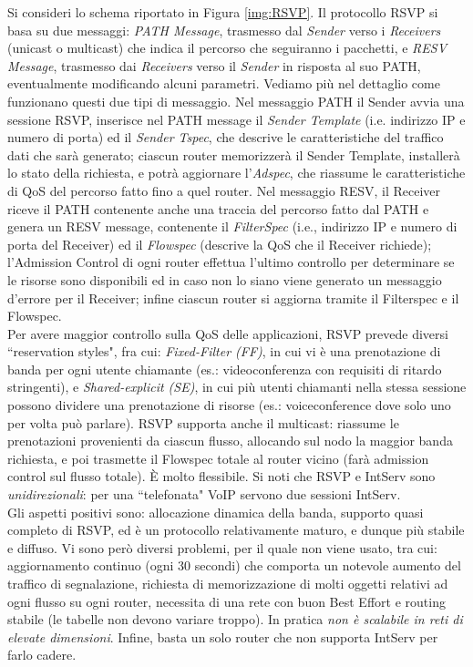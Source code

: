 Si consideri lo schema riportato in Figura \ref{img:RSVP}. Il protocollo RSVP si basa su due messaggi: \textit{PATH Message}, trasmesso dal \textit{Sender} verso i \textit{Receivers} (unicast o multicast) che indica il percorso che seguiranno i pacchetti, e \textit{RESV Message}, trasmesso dai \textit{Receivers} verso il \textit{Sender} in risposta al suo PATH, eventualmente modificando alcuni parametri. Vediamo più nel dettaglio come funzionano questi due tipi di messaggio. Nel messaggio PATH il Sender avvia una sessione RSVP, inserisce nel PATH message il \textit{Sender Template} (i.e. indirizzo IP e numero di porta) ed il \textit{Sender Tspec}, che descrive le caratteristiche del traffico dati che sarà generato; ciascun router memorizzerà il Sender Template, installerà lo stato della richiesta, e potrà aggiornare l'\textit{Adspec}, che riassume le caratteristiche di QoS del percorso fatto fino a quel router. Nel messaggio RESV, il Receiver riceve il PATH contenente anche una traccia del percorso fatto dal PATH e genera un RESV message, contenente il \textit{FilterSpec} (i.e., indirizzo IP e numero di porta del Receiver) ed il \textit{Flowspec} (descrive la QoS che il Receiver richiede); l'Admission Control di ogni router effettua l'ultimo controllo per determinare se le risorse sono disponibili ed in caso non lo siano viene generato un messaggio d'errore per il Receiver; infine ciascun router si aggiorna tramite il Filterspec e il Flowspec.\\
Per avere maggior controllo sulla QoS delle applicazioni, RSVP prevede diversi \textquotedblleft reservation styles", fra cui: \textit{Fixed-Filter (FF)}, in cui vi è una prenotazione di banda per ogni utente chiamante (es.: videoconferenza con requisiti di ritardo stringenti), e \textit{Shared-explicit (SE)}, in cui più utenti chiamanti nella stessa sessione possono dividere una prenotazione di risorse (es.: voiceconference dove solo uno per volta può parlare). RSVP supporta anche il multicast: riassume le prenotazioni provenienti da ciascun flusso, allocando sul nodo la maggior banda richiesta, e poi trasmette il Flowspec totale al router vicino (farà admission control sul flusso totale). È molto flessibile. Si noti che RSVP e IntServ sono \textit{unidirezionali}: per una \textquotedblleft telefonata" VoIP servono due sessioni IntServ.\\
Gli aspetti positivi sono: allocazione dinamica della banda, supporto quasi completo di RSVP, ed è un protocollo relativamente maturo, e dunque più stabile e diffuso. Vi sono però diversi problemi, per il quale non viene usato, tra cui: aggiornamento continuo (ogni 30 secondi) che comporta un notevole aumento del traffico di segnalazione, richiesta di memorizzazione di molti oggetti relativi ad ogni flusso su ogni router, necessita di una rete con buon Best Effort e routing stabile (le tabelle non devono variare troppo). In pratica \textit{non è scalabile in reti di elevate dimensioni}. Infine, basta un solo router che non supporta IntServ per farlo cadere.

